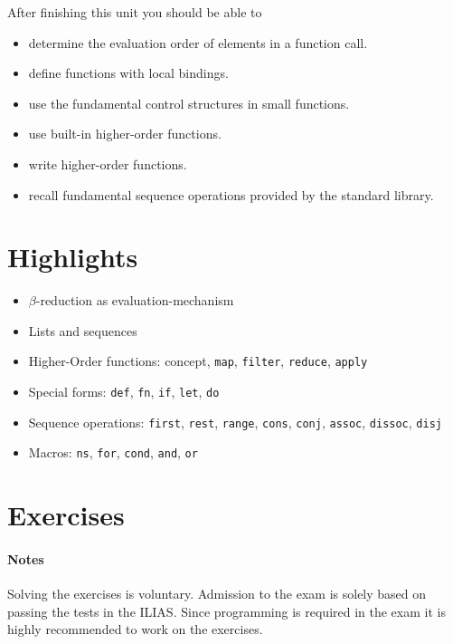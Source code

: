 \documentclass[11pt,a4paper]{article}
\begin{document}
After finishing this unit you should be able to

\begin{itemize}
	\item determine the evaluation order of elements in a function call.
    \item define functions with local bindings.
    \item use the fundamental control structures in small functions.
    \item use built-in higher-order functions.
    \item write higher-order functions.
    \item recall fundamental sequence operations provided by the standard library.
\end{itemize}

\section{Highlights}

\begin{itemize}
    \item $\beta$-reduction as evaluation-mechanism
    \item Lists and sequences
    \item Higher-Order functions: concept, \verb|map|, \verb|filter|, \verb|reduce|, \verb|apply|
    \item Special forms: \verb|def|, \verb|fn|, \verb|if|, \verb|let|, \verb|do|
    \item Sequence operations: \verb|first|, \verb|rest|, \verb|range|, \verb|cons|, \verb|conj|, \verb|assoc|, \verb|dissoc|, \verb|disj|
    \item Macros: \verb|ns|, \verb|for|, \verb|cond|, \verb|and|, \verb|or|
\end{itemize}



\section{Exercises}

\paragraph{Notes}
Solving the exercises is voluntary.
Admission to the exam is solely based on passing the tests in the ILIAS.
Since programming is required in the exam
it is highly recommended to work on the exercises.
\end{document}
